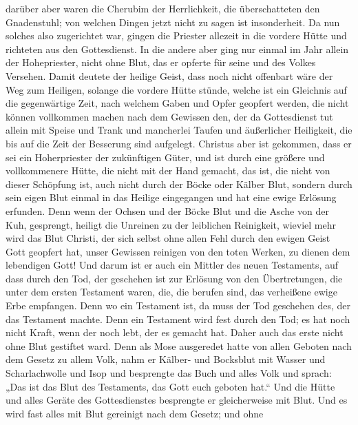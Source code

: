 darüber aber waren die Cherubim der Herrlichkeit, die überschatteten den
Gnadenstuhl; von welchen Dingen jetzt nicht zu sagen ist insonderheit.
 Da nun solches also zugerichtet war, gingen die Priester
allezeit in die vordere Hütte und richteten aus den Gottesdienst.
 In die andere aber ging nur einmal im Jahr allein der
Hohepriester, nicht ohne Blut, das er opferte für seine und des Volkes
Versehen.  Damit deutete der heilige Geist, dass noch nicht
offenbart wäre der Weg zum Heiligen, solange die vordere Hütte stünde,
 welche ist ein Gleichnis auf die gegenwärtige Zeit, nach
welchem Gaben und Opfer geopfert werden, die nicht können vollkommen
machen nach dem Gewissen den, der da Gottesdienst tut 
allein mit Speise und Trank und mancherlei Taufen und äußerlicher
Heiligkeit, die bis auf die Zeit der Besserung sind aufgelegt.
 Christus aber ist gekommen, dass er sei ein Hoherpriester
der zukünftigen Güter, und ist durch eine größere und vollkommenere
Hütte, die nicht mit der Hand gemacht, das ist, die nicht von dieser
Schöpfung ist,  auch nicht durch der Böcke oder Kälber
Blut, sondern durch sein eigen Blut einmal in das Heilige eingegangen
und hat eine ewige Erlösung erfunden.  Denn wenn der Ochsen
und der Böcke Blut und die Asche von der Kuh, gesprengt, heiligt die
Unreinen zu der leiblichen Reinigkeit,  wieviel mehr wird
das Blut Christi, der sich selbst ohne allen Fehl durch den ewigen Geist
Gott geopfert hat, unser Gewissen reinigen von den toten Werken, zu
dienen dem lebendigen Gott!  Und darum ist er auch ein
Mittler des neuen Testaments, auf dass durch den Tod, der geschehen ist
zur Erlösung von den Übertretungen, die unter dem ersten Testament
waren, die, die berufen sind, das verheißene ewige Erbe empfangen.
 Denn wo ein Testament ist, da muss der Tod geschehen des,
der das Testament machte.  Denn ein Testament wird fest
durch den Tod; es hat noch nicht Kraft, wenn der noch lebt, der es
gemacht hat.  Daher auch das erste nicht ohne Blut
gestiftet ward.  Denn als Mose ausgeredet hatte von allen
Geboten nach dem Gesetz zu allem Volk, nahm er Kälber- und Bocksblut mit
Wasser und Scharlachwolle und Isop und besprengte das Buch und alles
Volk  und sprach: „Das ist das Blut des Testaments, das
Gott euch geboten hat.``  Und die Hütte und alles Geräte
des Gottesdienstes besprengte er gleicherweise mit Blut. 
Und es wird fast alles mit Blut gereinigt nach dem Gesetz; und ohne
